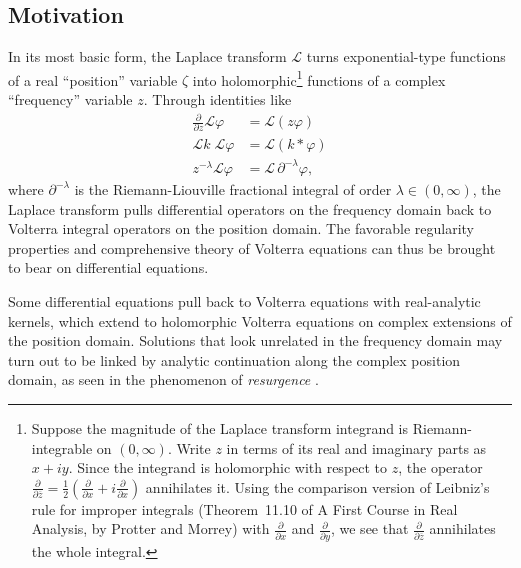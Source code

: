 \documentclass{article}
\theoremstyle{plain}
\newcommand{\laplace}{\mathcal{L}}
\newenvironment{verify}{\color{ForestGreen}}{\color{black}}
\begin{document}
\subsection{Motivation}\label{motivation}
In its most basic form, the Laplace transform $\laplace$ turns exponential-type functions of a real ``position'' variable $\zeta$ into holomorphic\begin{verify}\footnote{\begin{verify}Suppose the magnitude of the Laplace transform integrand is Riemann-integrable on $(0, \infty)$. Write $z$ in terms of its real and imaginary parts as $x + iy$. Since the integrand is holomorphic with respect to $z$, the operator $\frac{\partial}{\partial\overline{z}} = \frac{1}{2}\left(\frac{\partial}{\partial x} + i\frac{\partial}{\partial x}\right)$ annihilates it. Using the comparison version of Leibniz's rule for improper integrals (Theorem~11.10 of A First Course in Real Analysis, by Protter and Morrey) with $\frac{\partial}{\partial x}$ and $\frac{\partial}{\partial y}$, we see that $\frac{\partial}{\partial\overline{z}}$ annihilates the whole integral.\end{verify}}\end{verify} functions of a complex ``frequency'' variable $z$. Through identities like
\begin{align*}
\frac{\partial}{\partial z} \laplace \varphi & = \laplace(z\varphi) \\
\laplace k\;\laplace \varphi & = \laplace(k * \varphi) \\
z^{-\lambda} \laplace \varphi & = \laplace\,\partial^{-\lambda} \varphi,
\end{align*}
where $\partial^{-\lambda}$ is the Riemann-Liouville fractional integral of order $\lambda \in (0, \infty)$, the Laplace transform pulls differential operators on the frequency domain back to Volterra integral operators on the position domain. The favorable regularity properties and comprehensive theory of Volterra equations can thus be brought to bear on differential equations.

Some differential equations pull back to Volterra equations with real-analytic kernels, which extend to holomorphic Volterra equations on complex extensions of the position domain. Solutions that look unrelated in the frequency domain may turn out to be linked by analytic continuation along the complex position domain, as seen in the phenomenon of {\em resurgence} \textcolor{orange}{\cite{EcalleIII}\cite{lectures-marino} \cite[Section 2.4]{sternin1995borel}}.
\end{document}
